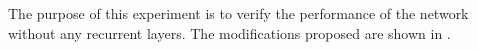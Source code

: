 
The purpose of this experiment is to verify the performance
of the network without any recurrent layers. The
modifications proposed are shown in .

